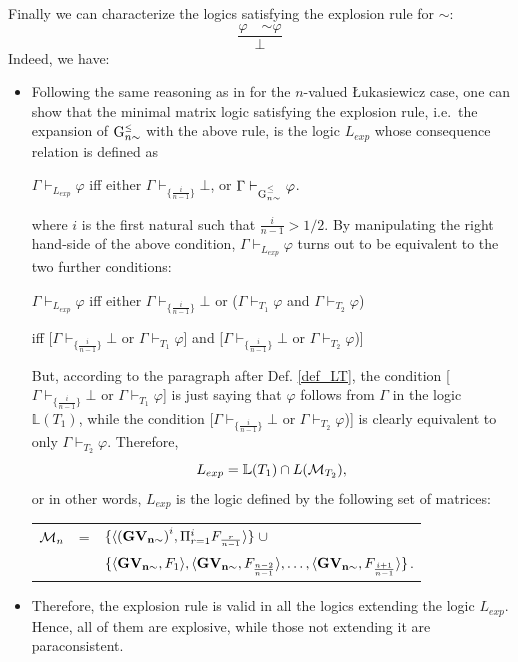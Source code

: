 \documentclass{article}
\theoremstyle{definition}
\newcommand{\ninv}{\mathord{\sim}}
\newcommand{\Gnsimleq}{\mathrm{G}\mystrut^{\text{\tiny $\leq$}}_{n\sim}}
\newcommand\mystrut{\rule{0pt}{7pt}}
\begin{document}
  Finally we can characterize the logics satisfying the explosion rule for $\ninv$:
  $$\frac{\varphi \quad \ninv\varphi}{\bot}$$
 Indeed, we have:  \begin{itemize}
 \item Following the same reasoning as in  \cite{CoEsGo} for the $n$-valued {\L}ukasiewicz case, one can show that  the minimal matrix logic satisfying the explosion rule, i.e.\ the expansion of $\Gnsimleq$ with the above rule, is the logic $L_{exp}$ whose consequence relation is defined as
 \begin{center}
 $\Gamma \vdash_{L_{exp}} \varphi$ iff either $\Gamma \vdash_{\{ \frac{i}{n-1}\}} \bot$,  or $\Gamma \vdash_{\Gnsimleq} \varphi$.
 \end{center}
where $i$ is the first natural such that $\frac{i}{n-1} > 1/2$. By manipulating the right hand-side of the above condition,  $\Gamma \vdash_{L_{exp}} \varphi$ turns out to be equivalent to the  two further conditions:

$\Gamma \vdash_{L_{exp}} \varphi$  iff  either $\Gamma \vdash_{\{ \frac{i}{n-1}\}} \bot$  or ($\Gamma \vdash_{T_1} \varphi$ and $\Gamma \vdash_{T_2} \varphi$) 

\hspace{1.5cm} iff  [$\Gamma \vdash_{\{ \frac{i}{n-1}\}} \bot$  or $\Gamma \vdash_{T_1} \varphi$]  and [$\Gamma \vdash_{\{ \frac{i}{n-1}\}} \bot$  or  $\Gamma \vdash_{T_2} \varphi$)]

\noindent But, according to the paragraph after Def. \ref{def_LT},   the condition [$\Gamma \vdash_{\{ \frac{i}{n-1}\}} \bot$  or $\Gamma \vdash_{T_1} \varphi$] is just saying that $\varphi$ follows from $\Gamma$ in the logic   $\mathbb{L}(T_1)$, while the condition  [$\Gamma \vdash_{\{ \frac{i}{n-1}\}} \bot$  or  $\Gamma \vdash_{T_2} \varphi$)] is clearly equivalent to only 
$\Gamma \vdash_{T_2} \varphi$. Therefore, 
$$ L_{exp} =  \mathbb{L}(T_1) \cap L({\cal M}_{T_2}),$$
or in other words, $L_{exp}$ is the logic defined by the following set of matrices:  

\begin{tabular}{lll}
${\cal M}_n$ & = &$\{ \langle {\bf (GV_{n \sim})}^{i},\Pi_{r = 1}^{i}F_{\frac{r}{n-1}}\rangle \} \; \cup$ \\
& & $ \{ \langle {\bf GV_{n \sim}},F_1\rangle, \langle {\bf GV_{n \sim}}, F_{\frac{n-2}{n-1}}\rangle, \ldots, \langle {\bf GV_{n \sim}}, F_{\frac{i+1}{n-1}}\rangle \}$.
\end{tabular}

 \item Therefore, the explosion rule is valid in all the logics extending the logic $L_{exp}$. Hence, all of them are explosive, while those not extending it are paraconsistent.
 \end{itemize}
\end{document}
